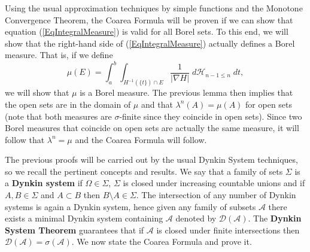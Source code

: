\documentclass[%
 aip,
 amsmath,amssymb,
 reprint,%
jmp]{revtex4-2}
\begin{document}
Using the usual approximation techniques by simple functions and the Monotone Convergence Theorem, the Coarea Formula will be proven if we can show that equation (\ref{EqIntegralMeasure}) is valid for all Borel sets. To this end, we will show that the right-hand side of (\ref{EqIntegralMeasure}) actually defines a Borel measure. That is, if we define
\begin{equation*}
    \mu(E) = \int_{a}^{b}\int_{H^{-1}(\{t\})\cap E} \frac{1}{|\nabla H|}\;d\mathscr{H}_{n-1\leq n}\;dt,
\end{equation*}
we will show that $\mu$ is a Borel measure. The previous lemma then implies that the open sets are in the domain of $\mu$ and that $\lambda^{n}(A) = \mu(A)$ for open sets (note that both measures are $\sigma$-finite since they coincide in open sets). Since two Borel measures that coincide on open sets are actually the same measure, it will follow that $\lambda^{n} = \mu$ and the Coarea Formula will follow.

The previous proofs will be carried out by the usual Dynkin System techniques, so we recall the pertinent concepts and results. We say that a family of sets $\Sigma$ is a \textbf{Dynkin system} if $\Omega\in\Sigma$, $\Sigma$ is closed under increasing countable unions and if $A,B\in\Sigma$ and $A\subset B$ then $B\setminus A\in\Sigma$. The intersection of any number of Dynkin systems is again a Dynkin system, hence given any family of subsets $\mathcal{A}$ there exists a minimal Dynkin system containing $\mathcal{A}$ denoted by $\mathcal{D}(\mathcal{A})$. The \textbf{Dynkin System Theorem} guarantees that if $\mathcal{A}$ is closed under finite intersections then $\mathcal{D}(\mathcal{A}) = \sigma(\mathcal{A})$. We now state the Coarea Formula and prove it.
\end{document}
